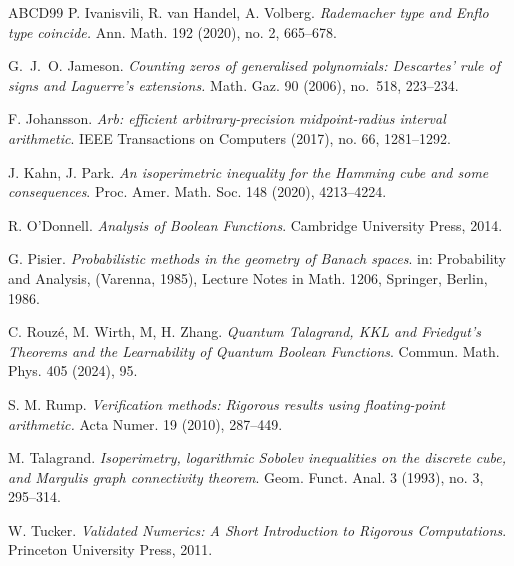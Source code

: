 \documentclass[12pt]{amsart}
\theoremstyle{plain}
\theoremstyle{definition}
\theoremstyle{remark}
\numberwithin{equation}{section}
\begin{document}
\begin{thebibliography}{ABCD99}
P. Ivanisvili, R. van Handel, A. Volberg.
{\em Rademacher type and Enflo type coincide.} Ann. Math. 192 (2020), no. 2, 665--678.

G.~J.~O. Jameson.
{\em Counting zeros of generalised polynomials: Descartes' rule of signs and Laguerre's extensions.} Math. Gaz. 90 (2006), no.~518, 223--234.

 F. Johansson. {\em Arb: efficient arbitrary-precision midpoint-radius interval arithmetic}. IEEE Transactions on Computers (2017), no. 66, 1281--1292.

J. Kahn, J. Park. {\em An isoperimetric inequality for the Hamming cube and some consequences}. Proc. Amer. Math. Soc. 148 (2020), 4213--4224.

 R. O'Donnell. {\em Analysis of Boolean Functions}. Cambridge University Press, 2014.

 G. Pisier. {\em Probabilistic methods in the geometry of Banach spaces}. in: Probability and Analysis, (Varenna, 1985), Lecture Notes in Math. 1206, Springer, Berlin, 1986.

 C. Rouz\'e, M. Wirth, M,  H. Zhang. {\em Quantum Talagrand, KKL and Friedgut’s Theorems and the Learnability of Quantum Boolean Functions}. Commun. Math. Phys. 405 (2024), 95.

 S. M. Rump. {\em Verification methods: Rigorous results using floating-point arithmetic.} Acta Numer. 19 (2010), 287--449.

 M. Talagrand. {\em Isoperimetry, logarithmic Sobolev inequalities on the discrete cube, and
Margulis graph connectivity theorem}. Geom. Funct. Anal. 3 (1993), no. 3, 295--314.

 W. Tucker. {\em Validated Numerics: A Short Introduction to Rigorous Computations}. Princeton University Press, 2011.




\end{thebibliography}
\end{document}
